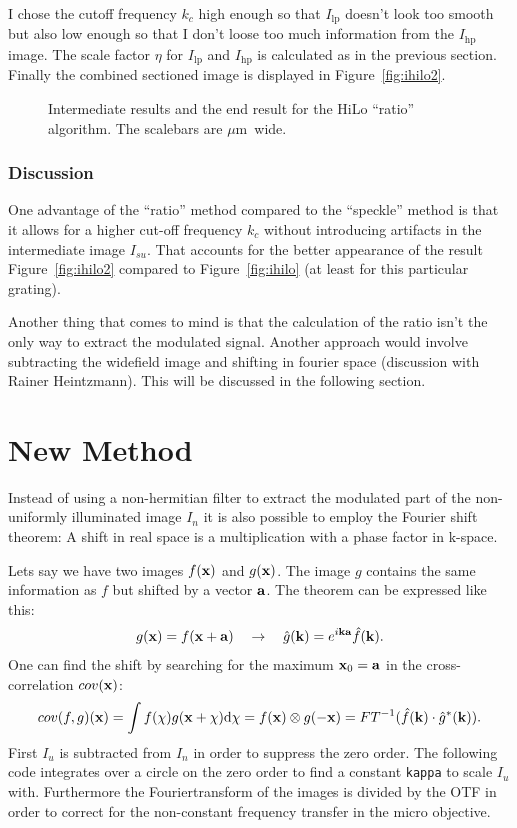 \documentclass[11pt]{scrartcl}
\newcommand{\figref}[1]{Figure~\ref{#1}}
\renewcommand{\v }[1]{{\bf #1}}
\begin{document}
I chose the cutoff frequency $k_c$ high enough so that $I_\textrm{lp}$
doesn't look too smooth but also low enough so that I don't loose too
much information from the $I_\textrm{hp}$ image. The scale factor
$\eta$ for $I_\textrm{lp}$ and $I_\textrm{hp}$ is calculated as in the
previous section. Finally the combined sectioned image is displayed in
\figref{fig:ihilo2}.

\begin{figure}[htb]
  \centering
  \caption{Intermediate results and the end result for the HiLo
    ``ratio'' algorithm. The scalebars are \unit[2]{$\mu$m} wide.}
  \label{fig:hilo2_2}
\end{figure}
\subsubsection*{Discussion}
One advantage of the ``ratio'' method compared to the ``speckle''
method is that it allows for a higher cut-off frequency $k_c$ without
introducing artifacts in the intermediate image $I_{su}$. That
accounts for the better appearance of the result \figref{fig:ihilo2}
compared to \figref{fig:ihilo} (at least for this particular grating).


Another thing that comes to mind is that the calculation of the ratio
isn't the only way to extract the modulated signal. Another approach
would involve subtracting the widefield image and shifting in fourier
space (discussion with Rainer Heintzmann). This will be discussed in
the following section.
\section{New Method}
Instead of using a non-hermitian filter to extract the modulated part
of the non-uniformly illuminated image $I_n$ it is also possible to
employ the Fourier shift theorem: A shift in real space is a
multiplication with a phase factor in k-space. 

Lets say we have two images $f(\v x)$ and $g(\v x)$. The image $g$
contains the same information as $f$ but shifted by a vector $\v
a$. The theorem can be expressed like this:
\begin{align}
  g(\v x)=f(\v x+\v a)
  \quad
  \rightarrow
  \quad
  \hat g(\v k)=e^{i\v k\v a}\hat f(\v k).
\end{align}
One can find the shift by searching for the maximum $\v x_0=\v a$ in
the cross-correlation $cov(\v x)$:
\begin{align}
  cov(f,g)(\v x)
  =\int f(\v\chi) g(\v x+\v\chi) \textrm{d}\v\chi
  =f(\v x)\otimes g(-\v x)
  =FT^{-1}(\hat f(\v k)\cdot\hat g^*(\v k)).
\end{align}
First $I_u$ is subtracted from $I_n$ in order to suppress the zero
order. The following code integrates over a circle on the zero order
to find a constant {\tt kappa} to scale $I_u$ with. Furthermore the
Fouriertransform of the images is divided by the OTF in order to
correct for the non-constant frequency transfer in the micro objective.
\end{document}
